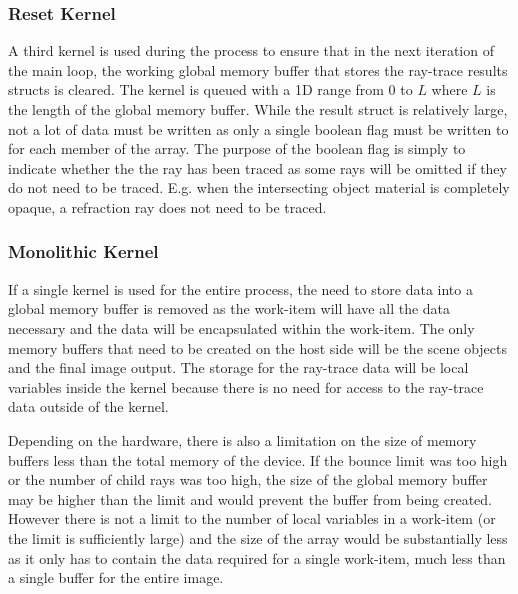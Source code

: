 \documentclass[final]{cmpreport}
\begin{document}
\subsubsection{Reset Kernel}

A third kernel is used during the process to ensure that in the next iteration of the main loop, the working global memory buffer that stores the ray-trace results structs is cleared. The kernel is queued with a 1D range from $0$ to $L$ where $L$ is the length of the global memory buffer. While the result struct is relatively large, not a lot of data must be written as only a single boolean flag must be written to for each member of the array. The purpose of the boolean flag is simply to indicate whether the the ray has been traced as some rays will be omitted if they do not need to be traced. E.g. when the intersecting object material is completely opaque, a refraction ray does not need to be traced. 

\subsubsection{Monolithic Kernel}

If a single kernel is used for the entire process, the need to store data into a global memory buffer is removed as the work-item will have all the data necessary and the data will be encapsulated within the work-item. The only memory buffers that need to be created on the host side will be the scene objects and the final image output. The storage for the ray-trace data will be local variables inside the kernel because there is no need for access to the ray-trace data outside of the kernel. 

Depending on the hardware, there is also a limitation on the size of memory buffers less than the total memory of the device. If the bounce limit was too high or the number of child rays was too high, the size of the global memory buffer may be higher than the limit and would prevent the buffer from being created. However there is not a limit to the number of local variables in a work-item (or the limit is sufficiently large) and the size of the array would be substantially less as it only has to contain the data required for a single work-item, much less than a single buffer for the entire image.
\end{document}
